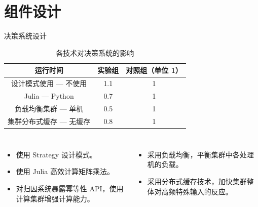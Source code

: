 \section{组件设计}
    \begin{frame}{决策系统设计}
        \begin{table}[]
            \centering
            \begin{tabular}{@{}ccc@{}}
                \toprule
                \textbf{运行时间} & \textbf{实验组} & \textbf{对照组（单位 1）} \\ \midrule
                设计模式使用 --- 不使用 & 1.1 & 1 \\
                Julia --- Python & 0.7 & 1 \\
                负载均衡集群 --- 单机 & 0.5 & 1 \\
                集群分布式缓存 --- 无缓存 & 0.8 & 1 \\ \bottomrule
            \end{tabular}
            \caption{各技术对决策系统的影响}
            \label{tab:tech-strategy}
        \end{table}
        
        \vspace{-1em}  %
        
        \begin{columns}
            \small
            \begin{itemize}
                \item 使用 Strategy 设计模式。
                \item 使用 Julia 高效计算矩阵乘法。
                \item 对归因系统暴露幂等性 API，使用计算集群增强计算能力。
            \end{itemize}

            \begin{itemize}
                \item 采用负载均衡，平衡集群中各处理机的负载。
                \item 采用分布式缓存技术，加快集群整体对高频特殊输入的反应。
            \end{itemize}
        \end{columns}
    \end{frame}


